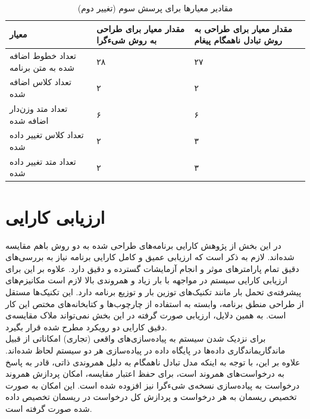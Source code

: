\begin{enumerate}

\begin{table}
\begin{center}
\begin{tabular}{|p{7cm}|p{4cm}|p{4cm}|}
	\hline
\textbf{معیار} & \textbf{مقدار معیار برای طراحی به روش شیءگرا} & \textbf{مقدار معیار برای طراحی به روش تبادل ناهمگام پیغام} 
\\ 
	\hline
	تعداد خطوط اضافه شده به متن برنامه
	 &
	 ۲۸
	 &
	 ۲۷
\\
	\hline
	تعداد کلاس اضافه شده
	 &
	 ۲
	 &
	 ۲
\\
	\hline
	تعداد متد وزن‌دار اضافه شده
	 &
	 ۶
	 &
	 ۶
\\
	\hline

	تعداد کلاس تغییر داده شده
	 &
	۲
	 &
	 ۳
\\
	\hline

	تعداد متد تغییر داده شده
	 &
	۲
	 &
	 ۳
\\
	\hline

\end{tabular}
\caption{\label{table:mod_result_3_2} مقادیر معیارها برای پرسش سوم (تغییر دوم)}
\end{center}
\end{table}

\end{enumerate}




\section{ارزیابی کارایی}
در این بخش از پژوهش کارایی برنامه‌های طراحی‌ شده به دو روش باهم مقایسه شده‌اند. لازم به ذکر است که ارزیابی عمیق و کامل کارایی برنامه نیاز به بررسی‌های دقیق تمام پارامترهای موثر و انجام آزمایشات گسترده و دقیق دارد. علاوه بر این برای ارزیابی کارایی سیستم در مواجهه با بار زیاد و همروندی بالا لازم است مکانیزم‌های پیشرفته‌ی تحمل بار مانند تکنیک‌های \gls{توزین بار} و توزیع برنامه دارد. این تکنیک‌ها مستقل از طراحی منطق برنامه، وابسته به استفاده از چارچوب‌ها و کتابخانه‌های مختص این کار است. به همین دلایل، ارزیابی صورت گرفته در این بخش نمی‌تواند ملاک مقایسه‌ی دقیق کارایی دو رویکرد مطرح شده قرار بگیرد. \\
برای نزدیک شدن سیستم به پیاده‌سازی‌های واقعی (تجاری) امکاناتی از قبیل ماندگاری\gls{ماندگاری} داده‌ها در پایگاه داده در پیاده‌سازی هر دو سیستم لحاظ شده‌اند. علاوه بر این، با توجه به اینکه مدل تبادل ناهمگام به دلیل همروندی ذاتی، قادر به پاسخ به درخواست‌های همروند است، برای حفظ اعتبار مقایسه، امکان پردازش همروند درخواست به پیاده‌سازی نسخه‌ی شیءگرا نیز افزوده شده است. این امکان به صورت تخصیص ریسمان به هر درخواست و پردازش کل درخواست در ریسمان تخصیص داده شده صورت گرفته است.

